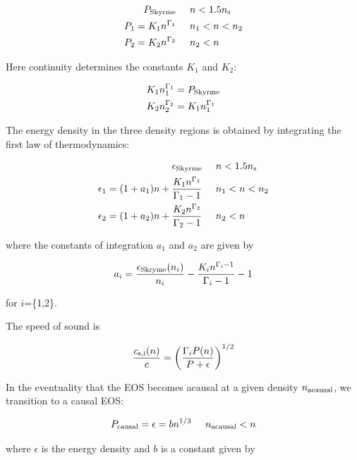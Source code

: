 \documentclass[fleqn,usenatbib]{mnras}
\begin{document}
\begin{align}
\nonumber P_{\rm Skyrme} & \;\;\;\;\; n<1.5n_{\rm s}  \\
\nonumber P_1 = K_1 n^{\Gamma_1}  & \;\;\;\;\;n_1 <n<n_2  \\
P_2 = K_2 n^{\Gamma_2} & \;\;\;\;\;  n_2 < n
\end{align}

Here continuity determines the constants $K_1$ and $K_2$:

\begin{align}\nonumber
K_1 n_1^{\Gamma_1} &= P_{\rm Skyrme}   \\
K_2 n_2^{\Gamma_2} &= K_1 n_1^{\Gamma_1} 
\end{align}

The energy density in the three density regions is obtained by integrating the first law of thermodynamics:

\begin{align}\nonumber
\epsilon_{\rm Skyrme} & \;\;\;\;\; n<1.5n_{\rm s} \\
\nonumber \epsilon_1 = (1+a_1)n + \frac{K_1 n^{\Gamma_1}}{\Gamma_1 -1}  & \;\;\;\;\;n_1 <n<n_2 \\
\epsilon_2 = (1+a_2)n + \frac{K_2 n^{\Gamma_2}}{\Gamma_2 -1} & \;\;\;\;\;  n_2 < n
\end{align}

\noindent where the constants of integration $a_1$ and $a_2$ are given by

\begin{align}
a_i = \frac{\epsilon_{\rm Skryme} (n_i)}{n_i} - \frac{K_i n^{\Gamma_i - 1}}{\Gamma_i -1} - 1
\end{align}

\noindent for $i$=\{1,2\}.

The speed of sound is 

\begin{equation}
\frac{c_{\rm s,i}(n)}{c} = \bigg( \frac{\Gamma_i P(n)}{P + \epsilon}\bigg)^{1/2}
\end{equation}

In the eventuality that the EOS becomes acausal at a given density $n_{\rm acausal}$, we transition to a causal EOS:

\begin{equation}
P_{\rm causal} = \epsilon = bn^{1/3} \;\;\;\;\;  n_{\rm acausal} < n
\end{equation}

\noindent where $\epsilon$ is the energy density and $b$ is a constant given by
\end{document}
